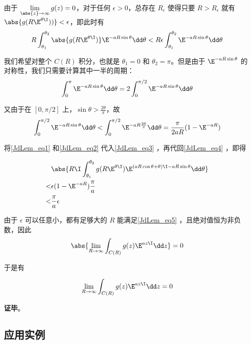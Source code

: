由于 $\lim\limits_{\abs{z}\to\infty}g(z)=0$，对于任何 $\epsilon>0$，总存在 $R_\epsilon$ 使得只要 $R>R_\epsilon$ 就有 $\abs{g(R\E^{\theta\I}))}<\epsilon$，即此时有
\begin{equation}\label{JdLem_eq3}
R\int_{\theta_1}^{\theta_2}\abs{g(R\E^{\theta\I})}\E^{-aR\sin\theta}\dd\theta  <  R\epsilon\int_{\theta_1}^{\theta_2}\E^{-aR\sin\theta}\dd\theta
\end{equation}

我们希望对整个 $C(R)$ 积分，也就是 $\theta_1=0$ 和 $\theta_2=\pi$。但是由于 $\E^{-aR\sin\theta}$ 的对称性，我们只需要计算其中一半的周期：
\begin{equation}\label{JdLem_eq1}
\int_{0}^{\pi}\E^{-aR\sin\theta}\dd\theta=2\int^{\pi/2}_{0}\E^{-aR\sin\theta}\dd\theta
\end{equation}

又由于在 $[0, \pi/2]$ 上，$\sin\theta>\frac{2\theta}{\pi}$，故
\begin{equation}\label{JdLem_eq2}
\int^{\pi/2}_{0}\E^{-aR\sin\theta}\dd\theta<\int^{\pi/2}_{0}\E^{-aR\frac{2\theta}{\pi}}\dd\theta=\frac{\pi}{2aR}(1-\E^{-aR})
\end{equation}

将\autoref{JdLem_eq1} 和\autoref{JdLem_eq2} 代入\autoref{JdLem_eq3} ，再代回\autoref{JdLem_eq4} ，即得

\begin{equation}\label{JdLem_eq5}
\begin{aligned}
&\abs{R\I\int_{\theta_1}^{\theta_2}g(R\E^{\theta\I})\E^{(aR\cos\theta+\theta)\I-aR\sin\theta}\dd\theta}\\
<&\epsilon(1-\E^{-aR})\frac{\pi}{a}\\
<&\frac{\pi}{a}\epsilon
\end{aligned}
\end{equation}

由于 $\epsilon$ 可以任意小，都有足够大的 $R$ 能满足\autoref{JdLem_eq5} ，且绝对值恒为非负数，因此
\begin{equation}
\abs{\lim\limits_{R\to \infty}\int_{C(R)}g(z)\E^{az\I}\dd z}=0
\end{equation}

于是有

\begin{equation}
\lim\limits_{R\to \infty}\int_{C(R)}g(z)\E^{az\I}\dd z=0
\end{equation}


\textbf{证毕}。


\subsection{应用实例}


